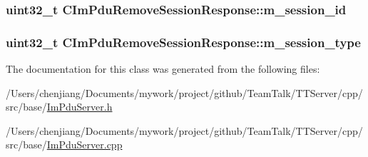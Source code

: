 \subsubsection[{m\+\_\+session\+\_\+id}]{\setlength{\rightskip}{0pt plus 5cm}uint32\+\_\+t C\+Im\+Pdu\+Remove\+Session\+Response\+::m\+\_\+session\+\_\+id\hspace{0.3cm}{\ttfamily [private]}}\label{class_c_im_pdu_remove_session_response_a41b8afa60395fde2990b9530c5d90f15}
\hypertarget{class_c_im_pdu_remove_session_response_a349393a53f9f7225df445c45e8839308}{}
\subsubsection[{m\+\_\+session\+\_\+type}]{\setlength{\rightskip}{0pt plus 5cm}uint32\+\_\+t C\+Im\+Pdu\+Remove\+Session\+Response\+::m\+\_\+session\+\_\+type\hspace{0.3cm}{\ttfamily [private]}}\label{class_c_im_pdu_remove_session_response_a349393a53f9f7225df445c45e8839308}


The documentation for this class was generated from the following files\+:\begin{DoxyCompactItemize}
\item 
/\+Users/chenjiang/\+Documents/mywork/project/github/\+Team\+Talk/\+T\+T\+Server/cpp/src/base/\hyperlink{_im_pdu_server_8h}{Im\+Pdu\+Server.\+h}\item 
/\+Users/chenjiang/\+Documents/mywork/project/github/\+Team\+Talk/\+T\+T\+Server/cpp/src/base/\hyperlink{_im_pdu_server_8cpp}{Im\+Pdu\+Server.\+cpp}\end{DoxyCompactItemize}
